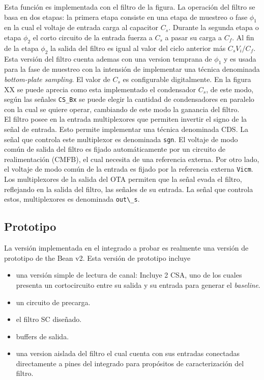 Esta función es implementada con el filtro de la figura. La operación del filtro se basa en dos etapas: la primera etapa consiste en una etapa de muestreo o fase $\phi_1$ en la cual el voltaje de entrada carga al capacitor $C_s$. Durante la segunda etapa o etapa $\phi_2$ el corto circuito de la entrada fuerza a $C_s$ a pasar su carga a $C_f$. Al fin de la etapa $\phi_2$ la salida del filtro es igual al valor del ciclo anterior más $C_s V_i/C_f$.\\
Esta versión del filtro cuenta ademas con una version temprana de $\phi_1$ y es usada para la fase de muestreo con la intensión de implementar una técnica denominada \textit{bottom-plate sampling}.
El valor de $C_s$ es configurable digitalmente. En la figura XX se puede aprecia como esta implementado el condensador $C_s$, de este modo, según las señales \verb+CS_Bx+ se puede elegir la cantidad de condensadores en paralelo con la cual se quiere operar, cambiando de este modo la ganancia del filtro.\\
El filtro posee en la entrada multiplexores que permiten invertir el signo de la señal de entrada. Esto permite implementar una técnica denominada  CDS. La señal que controla este multiplexor es denominada \verb+sgn+.
El voltaje de modo común de salida del filtro es fijado automáticamente por un circuito de realimentación (CMFB), el cual necesita de una referencia externa. Por otro lado, el voltaje de modo común de la entrada es fijado por la referencia externa \verb+Vicm+.\\
Los multiplexores de la salida del OTA permiten que la señal evada el filtro, reflejando en la salida del filtro, las señales de su entrada. La señal que controla estos, multiplexores es denominada \verb+out\_s+.

\subsection{Prototipo}

La versión implementada en el integrado a probar es realmente una versión de prototipo de the Bean v2. Esta versión de prototipo incluye
\begin{itemize}
\item una versión simple de lectura de canal: Incluye 2 CSA, uno de los cuales presenta un cortocircuito entre su salida y su entrada para generar el \textit{baseline}.
\item un circuito de precarga.
\item el filtro SC diseñado.
\item buffers de salida.
\item una version aislada del filtro el cual cuenta con sus entradas conectadas directamente a pines del integrado para propósitos de caracterización del filtro.

\end{itemize}


